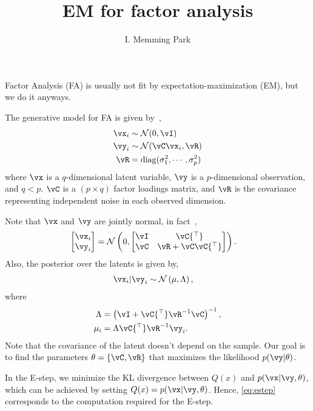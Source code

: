 \documentclass{article}
\title{EM for factor analysis}
\author{I. Memming Park}
\DeclareMathOperator{\diag}{diag}
\newcommand{\gaussian}{\ensuremath{\mathcal{N}}}
\newcommand{\trp}{{^\top}} %
\newcommand{\inv}{^{-1}}
\newcounter{ct}
\begin{document}
\maketitle
Factor Analysis (FA) is usually not fit by expectation-maximization (EM), but we do it anyways.

The generative model for FA is given by~\cite{Roweis1999},
\begin{align}\label{eq:model}
    \vx_i &\sim \gaussian(0, \vI)\nonumber\\
    \vy_i &\sim \gaussian(\vC\vx_i, \vR)\\
    \vR &= \diag(\sigma_1^2, \cdots, \sigma_p^2)\nonumber
\end{align}
where $\vx$ is a $q$-dimensional latent variable,
$\vy$ is a $p$-dimensional observation, and $q < p$.
$\vC$ is a $(p \times q)$ factor loadings matrix, and
$\vR$ is the covariance representing independent noise in each observed
dimension.

Note that $\vx$ and $\vy$ are jointly normal, in fact~\cite{Bishop2006},
\begin{align}
    \begin{bmatrix}
	\vx_i\\\vy_i
    \end{bmatrix}
    &=
    \gaussian\left(0, \begin{bmatrix}
	    \vI & \vC\trp\\
	    \vC & \vR + \vC\vC\trp
	\end{bmatrix}
    \right).
\end{align}
Also, the posterior over the latents is given by,
\begin{align}\label{eq:latent:posterior}
    \vx_i | \vy_i &\sim \gaussian\left(\mu, \Lambda\right),
\end{align}
where
\begin{align}
    \label{eq:estep}
    \Lambda &= \left(\vI + \vC\trp \vR\inv \vC\right)\inv,\nonumber\\
    \mu_i &= \Lambda \vC\trp \vR\inv \vy_i.
\end{align}
Note that the covariance of the latent doesn't depend on the sample.
Our goal is to find the parameters $\theta = \{\vC, \vR\}$ that maximizes the
likelihood $p(\vy|\theta)$.

In the E-step, we minimize the KL divergence between $Q(x)$ and
$p(\vx|\vy,\theta)$, which can be achieved by setting $Q(x) =
p(\vx|\vy,\theta)$. Hence, \eqref{eq:estep} corresponds to the computation
required for the E-step.
\end{document}
